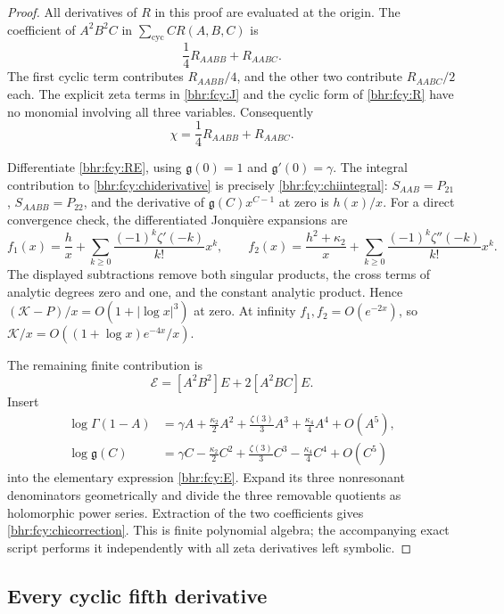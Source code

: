 \documentclass[11pt]{article}
\numberwithin{equation}{section}
\theoremstyle{plain}
\theoremstyle{definition}
\theoremstyle{remark}
\begin{document}
\begin{proof}
All derivatives of \(R\) in this proof are evaluated at the
origin. The coefficient of \(A^2B^2C\) in
\(\sum_{\mathrm{cyc}}CR(A,B,C)\) is
\[
 \frac14R_{AABB}+R_{AABC}.
\]
The first cyclic term contributes \(R_{AABB}/4\), and the
other two contribute \(R_{AABC}/2\) each. The explicit
zeta terms in \eqref{bhr:fcy:J} and the cyclic form of
\eqref{bhr:fcy:R} have no monomial involving all three variables.
Consequently
\begin{equation}\label{bhr:fcy:chiderivative}
 \chi=\frac14R_{AABB}+R_{AABC}.
\end{equation}

Differentiate \eqref{bhr:fcy:RE}, using \(\mathfrak g(0)=1\) and
\(\mathfrak g'(0)=\gamma\). The integral contribution to
\eqref{bhr:fcy:chiderivative} is precisely \eqref{bhr:fcy:chiintegral}:
\(S_{AAB}=P_{21}\), \(S_{AABB}=P_{22}\), and the derivative
of \(\mathfrak g(C)x^{C-1}\) at zero is \(h(x)/x\).
For a direct convergence check, the differentiated Jonqui\`ere
expansions are
\[
 f_1(x)=\frac h x+\sum_{k\ge0}
       \frac{(-1)^k\zeta'(-k)}{k!}x^k,\qquad
 f_2(x)=\frac{h^2+\kappa_2}x+\sum_{k\ge0}
       \frac{(-1)^k\zeta''(-k)}{k!}x^k.
\]
The displayed subtractions remove both singular products, the
cross terms of analytic degrees zero and one, and the constant
analytic product. Hence \((\mathcal K-P)/x=O(1+|\log x|^3)\) at zero.
At infinity \(f_1,f_2=O(e^{-2x})\), so
\(\mathcal K/x=O((1+\log x)e^{-4x}/x)\).

The remaining finite contribution is
\[
 \mathcal E=[A^2B^2]E+2[A^2BC]E.
\]
Insert
\begin{align*}
 \log\Gamma(1-A)&=\gamma A+\frac{\kappa_2}{2} A^2
                  +\frac{\zeta(3)}3A^3+\frac{\kappa_4}4A^4+O(A^5),\\
 \log \mathfrak g(C)&=\gamma C-\frac{\kappa_2}{2} C^2
                  +\frac{\zeta(3)}3C^3-\frac{\kappa_4}4C^4+O(C^5)
\end{align*}
into the elementary expression \eqref{bhr:fcy:E}. Expand its three
nonresonant denominators geometrically and divide the three
removable quotients as holomorphic power series. Extraction of
the two coefficients gives \eqref{bhr:fcy:chicorrection}. This is
finite polynomial algebra; the accompanying exact script performs
it independently with all zeta derivatives left symbolic.
\end{proof}

\subsection{Every cyclic fifth derivative}
\end{document}
